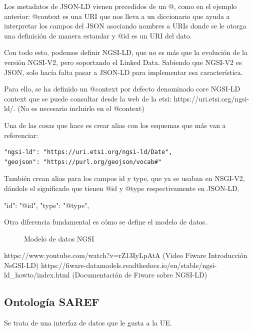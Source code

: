 \documentclass[12pt, a4paper, twoside]{article}
\begin{document}
Los metadatos de JSON-LD vienen precedidos de un @, como en el ejemplo anterior:
@context es una URI que nos lleva a un diccionario que ayuda a interpretar los campos
del JSON asociando nombres a URIs donde se le otorga una definición
de manera estandar y @id es un URI del dato.

Con todo esto, podemos definir NGSI-LD, que no es más que la evolución de la versión
NGSI-V2, pero soportando el Linked Data. Sabiendo que NGSI-V2 es JSON, solo hacía
falta pasar a JSON-LD para implementar esa característica.

Para ello, se ha definido un @context por defecto denominado core NGSI-LD context
que se puede consultar desde la web de la etsi: https://uri.etsi.org/ngsi-ld/.
(No es necesario incluirlo en el @context)

Una de las cosas que hace es crear alias con los esquemas que más van a referenciar:
\begin{lstlisting}
"ngsi-ld": "https://uri.etsi.org/ngsi-ld/Date",
"geojson": "https://purl.org/geojson/vocab#"
\end{lstlisting}

También crean alias para los campos id y type, que ya se usaban en NSGI-V2,
dándole el significado que tienen @id y @type respectivamente en JSON-LD.

"id": "@id",
"type": "@type",

Otra diferencia fundamental es cómo se define el modelo de datos.
\begin{figure}[h]
  \centering
  \caption{Modelo de datos NGSI}
\end{figure}

https://www.youtube.com/watch?v=rZ13IyLpAtA (Video Fiware Introducción NsGSI-LD)
https://fiware-datamodels.readthedocs.io/en/stable/ngsi-ld\_howto/index.html 
 (Documentación de Fiware sobre NGSI-LD)

\subsection{Ontología SAREF}
Se trata de una interfaz de datos que le gusta a la UE.
\end{document}
